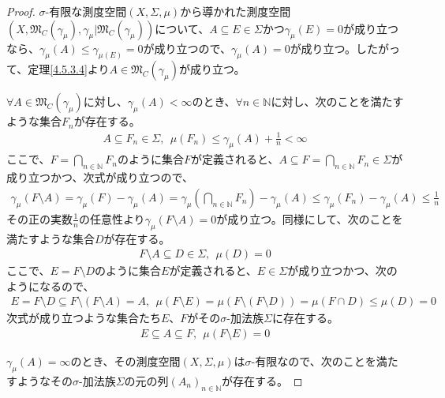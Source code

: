 \documentclass[dvipdfmx]{jsarticle}
\begin{document}
\begin{proof}
$\sigma$-有限な測度空間$(X,\varSigma,\mu)$から導かれた測度空間$\left( X,\mathfrak{M}_{C}\left( \gamma_{\mu} \right),\gamma_{\mu}|\mathfrak{M}_{C}\left( \gamma_{\mu} \right) \right)$について、$A \subseteq E \in \varSigma$かつ$\gamma_{\mu}(E) = 0$が成り立つなら、$\gamma_{\mu}(A) \leq \gamma_{\mu(E)} = 0$が成り立つので、$\gamma_{\mu}(A) = 0$が成り立つ。したがって、定理\ref{4.5.3.4}より$A \in \mathfrak{M}_{C}\left( \gamma_{\mu} \right)$が成り立つ。\par
$\forall A \in \mathfrak{M}_{C}\left( \gamma_{\mu} \right)$に対し、$\gamma_{\mu}(A) < \infty$のとき、$\forall n \in \mathbb{N}$に対し、次のことを満たすような集合$F_{n}$が存在する。
\begin{align*}
A \subseteq F_{n} \in \varSigma,\ \ \mu\left( F_{n} \right) \leq \gamma_{\mu}(A) + \frac{1}{n} < \infty
\end{align*}
ここで、$F = \bigcap_{n \in \mathbb{N}} F_{n}$のように集合$F$が定義されると、$A \subseteq F = \bigcap_{n \in \mathbb{N}} F_{n} \in \varSigma$が成り立つかつ、次式が成り立つので、
\begin{align*}
\gamma_{\mu}(F \setminus A) = \gamma_{\mu}(F) - \gamma_{\mu}(A) = \gamma_{\mu}\left( \bigcap_{n \in \mathbb{N}} F_{n} \right) - \gamma_{\mu}(A) \leq \gamma_{\mu}\left( F_{n} \right) - \gamma_{\mu}(A) \leq \frac{1}{n}
\end{align*}
その正の実数$\frac{1}{n}$の任意性より$\gamma_{\mu}(F \setminus A) = 0$が成り立つ。同様にして、次のことを満たすような集合$D$が存在する。
\begin{align*}
F \setminus A \subseteq D \in \varSigma,\ \ \mu(D) = 0
\end{align*}
ここで、$E = F \setminus D$のように集合$E$が定義されると、$E \in \varSigma$が成り立つかつ、次のようになるので、
\begin{align*}
E = F \setminus D \subseteq F \setminus (F \setminus A) = A,\ \ \mu(F \setminus E) = \mu\left( F \setminus (F \setminus D) \right) = \mu(F \cap D) \leq \mu(D) = 0
\end{align*}
次式が成り立つような集合たち$E$、$F$がその$\sigma$-加法族$\varSigma$に存在する。
\begin{align*}
E \subseteq A \subseteq F,\ \ \mu(F \setminus E) = 0
\end{align*}\par
$\gamma_{\mu}(A) = \infty$のとき、その測度空間$(X,\varSigma,\mu)$は$\sigma$-有限なので、次のことを満たすようなその$\sigma$-加法族$\varSigma$の元の列$\left( A_{n} \right)_{n \in \mathbb{N}}$が存在する。

\end{proof}
\end{document}
